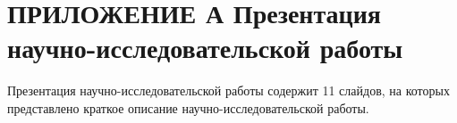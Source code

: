 \chapter*{ПРИЛОЖЕНИЕ А Презентация научно-исследовательской работы}
Презентация научно-исследовательской работы содержит 11 слайдов, на которых представлено краткое описание научно-исследовательской работы.